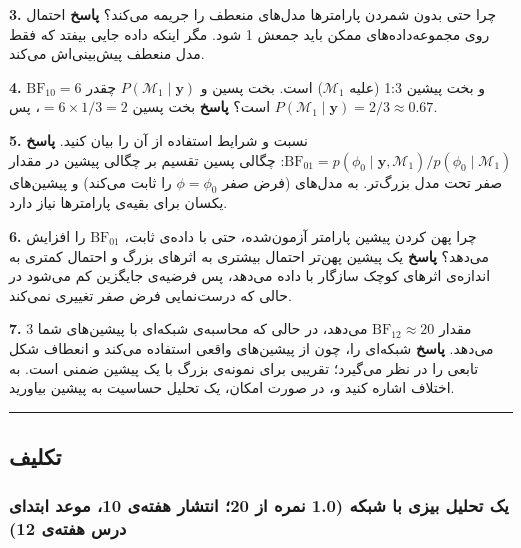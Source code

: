 \textbf{3.} چرا  حتی بدون شمردن پارامترها مدل‌های
منعطف را جریمه می‌کند؟ \textbf{پاسخ} احتمال روی مجموعه‌داده‌های ممکن باید
جمعش 1 شود. مگر اینکه داده جایی بیفتد که فقط مدل منعطف پیش‌بینی‌اش می‌کند.

\textbf{4.} \(\mathrm{BF}_{10} = 6\) و بخت پیشین 1:3 (علیه
\(\mathcal{M}_1\)) است. بخت پسین و \(P(\mathcal{M}_1\mid\mathbf{y})\)
چقدر است؟ \textbf{پاسخ} بخت پسین \(= 6 \times 1/3 = 2\)، پس
\(P(\mathcal{M}_1\mid\mathbf{y}) = 2/3 \approx 0.67\).

\textbf{5.} نسبت  و شرایط استفاده از آن را بیان کنید.
\textbf{پاسخ}
\(\mathrm{BF}_{01} = p(\phi_0\mid\mathbf{y},\mathcal{M}_1)/p(\phi_0\mid\mathcal{M}_1)\):
چگالی پسین تقسیم بر چگالی پیشین در مقدار صفر تحت مدل بزرگ‌تر. به مدل‌های
 (فرض صفر \(\phi = \phi_0\) را ثابت می‌کند) و پیشین‌های یکسان
برای بقیه‌ی پارامترها نیاز دارد.

\textbf{6.} چرا پهن کردن پیشین پارامتر آزمون‌شده، حتی با داده‌ی ثابت،
\(\mathrm{BF}_{01}\) را افزایش می‌دهد؟ \textbf{پاسخ} یک پیشین پهن‌تر
احتمال بیشتری به اثرهای بزرگ و احتمال کمتری به اندازه‌ی اثرهای کوچک
سازگار با داده می‌دهد، پس  فرضیه‌ی جایگزین کم
می‌شود در حالی که درست‌نمایی فرض صفر تغییری نمی‌کند.

\textbf{7.}  مقدار \(\mathrm{BF}_{12} \approx 20\) می‌دهد، در
حالی که محاسبه‌ی شبکه‌ای با پیشین‌های شما 3 می‌دهد. \textbf{پاسخ}  شبکه‌ای را، چون از پیشین‌های واقعی استفاده می‌کند و انعطاف شکل
تابعی را در نظر می‌گیرد؛  تقریبی برای نمونه‌ی بزرگ با یک پیشین
ضمنی است. به اختلاف اشاره کنید و، در صورت امکان، یک تحلیل حساسیت به
پیشین بیاورید.

\begin{center}\rule{0.5\linewidth}{0.5pt}\end{center}


\subsection{تکلیف}

\subsubsection{\texorpdfstring{ یک تحلیل بیزی با شبکه (1.0 نمره
از 20؛ انتشار هفته‌ی 10، موعد ابتدای درس هفته‌ی
12)}{A4: یک تحلیل بیزی با شبکه (1.0 نمره از 20؛ انتشار هفته‌ی 10، موعد ابتدای درس هفته‌ی 12)}}

